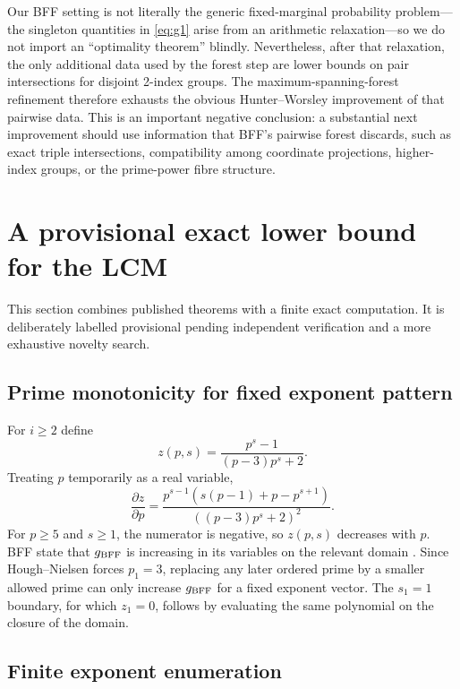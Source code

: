 \documentclass[11pt]{article}
\theoremstyle{definition}
\begin{document}
Our BFF setting is not literally the generic fixed-marginal probability problem---the singleton
quantities in \eqref{eq:g1} arise from an arithmetic relaxation---so we do not import an
``optimality theorem'' blindly.  Nevertheless, after that relaxation, the only additional data
used by the forest step are lower bounds on pair intersections for disjoint 2-index groups.  The
maximum-spanning-forest refinement therefore exhausts the obvious Hunter--Worsley improvement of
that pairwise data.  This is an important negative conclusion: a substantial next improvement
should use information that BFF's pairwise forest discards, such as exact triple intersections,
compatibility among coordinate projections, higher-index groups, or the prime-power fibre
structure.

\section{A provisional exact lower bound for the LCM}\label{sec:218m}

This section combines published theorems with a finite exact computation.  It is deliberately
labelled provisional pending independent verification and a more exhaustive novelty search.

\subsection{Prime monotonicity for fixed exponent pattern}

For $i\ge2$ define
\[
 z(p,s)=\frac{p^s-1}{(p-3)p^s+2}.
\]
Treating $p$ temporarily as a real variable,
\begin{equation}\label{eq:zderivative}
 \frac{\partial z}{\partial p}
 =\frac{p^{s-1}\left(s(p-1)+p-p^{s+1}\right)}{\left((p-3)p^s+2\right)^2}.
\end{equation}
For $p\ge5$ and $s\ge1$, the numerator is negative, so $z(p,s)$ decreases with $p$.
BFF state that $g_{\rm BFF}$ is increasing in its variables on the relevant domain
\cite{BFF1987}.  Since Hough--Nielsen forces $p_1=3$, replacing any later ordered prime by a
smaller allowed prime can only increase $g_{\rm BFF}$ for a fixed exponent vector.  The
$s_1=1$ boundary, for which $z_1=0$, follows by evaluating the same polynomial on the closure of
the domain.

\subsection{Finite exponent enumeration}
\end{document}
